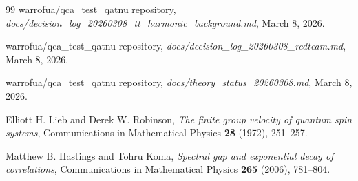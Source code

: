 \documentclass[11pt]{article}
\begin{document}
\begin{thebibliography}{99}
warrofua/qca\_test\_qatnu repository,
\emph{docs/decision\_log\_20260308\_tt\_harmonic\_background.md},
March 8, 2026.

warrofua/qca\_test\_qatnu repository,
\emph{docs/decision\_log\_20260308\_redteam.md},
March 8, 2026.

warrofua/qca\_test\_qatnu repository,
\emph{docs/theory\_status\_20260308.md},
March 8, 2026.

Elliott H. Lieb and Derek W. Robinson,
\emph{The finite group velocity of quantum spin systems},
Communications in Mathematical Physics \textbf{28} (1972), 251--257.

Matthew B. Hastings and Tohru Koma,
\emph{Spectral gap and exponential decay of correlations},
Communications in Mathematical Physics \textbf{265} (2006), 781--804.

\end{thebibliography}
\end{document}

